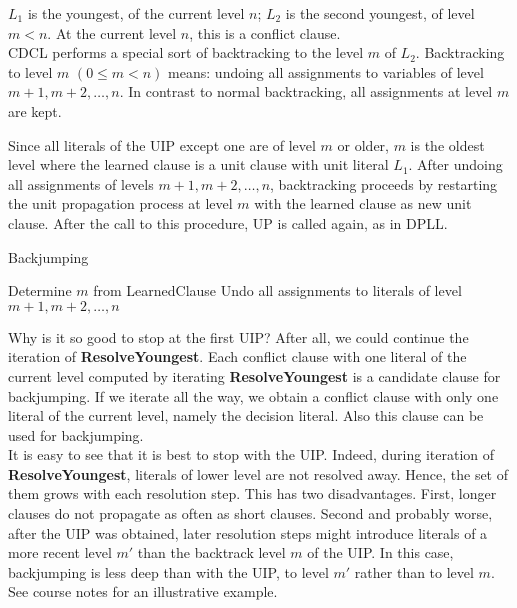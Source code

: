 \documentclass[10pt,a4paper]{article}
\theoremstyle{definition}
\begin{document}
$L_1$ is the youngest, of the current level $n$; $L_2$ is the second youngest, of level $m < n$. At the current level $n$, this is a conflict clause. \\

CDCL performs a special sort of backtracking to the level $m$ of $L_2$. Backtracking to level $m$ $(0 \leq m < n)$ means: undoing all assignments to variables of level $m+1, m+2, \dots,  n$. In contrast to normal backtracking, all assignments at level $m$ are kept.

Since all literals of the UIP except one are of level $m$ or older, $m$ is the oldest level where the learned clause is a unit clause with unit literal $L_1$. After undoing all assignments of levels $m + 1, m + 2, \dots, n$, backtracking proceeds by restarting the unit propagation process at level $m$ with the learned clause as new unit clause. After the call to this procedure, UP is called again, as in DPLL.

\begin{algorithm}
\caption{Backjumping}
\begin{algorithmic}[1]

    \State Determine $m$ from LearnedClause
    \State Undo all assignments to literals of level $m+1,m+2,\dots,n$
\EndProcedure
\end{algorithmic}
\end{algorithm}

Why is it so good to stop at the first UIP? After all, we could continue the iteration of \textbf{ResolveYoungest}. Each conflict clause with one literal of the current level computed by iterating \textbf{ResolveYoungest} is a candidate clause for backjumping. If we iterate all the way, we obtain a conflict clause with only one literal of the current level, namely the decision literal. Also this
clause can be used for backjumping. \\

It is easy to see that it is best to stop with the UIP. Indeed, during iteration of \textbf{ResolveYoungest}, literals of lower level are not resolved away. Hence, the set of them grows with each resolution step. This has two disadvantages. First, longer clauses do not propagate as often as short clauses. Second and probably worse, after the UIP was obtained, later resolution steps might introduce literals of a more recent level $m'$ than the backtrack level $m$ of the UIP. In this case, backjumping is less deep than with the UIP, to level $m'$ rather than to level $m$. See course notes for an illustrative example. \\
\end{document}
